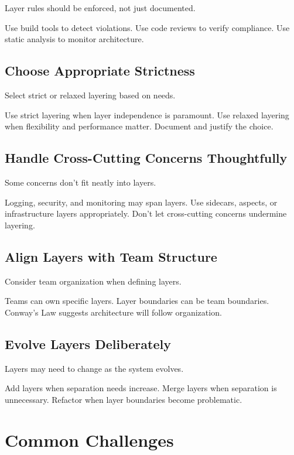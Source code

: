 \documentclass[11pt]{article}
\begin{document}
Layer rules should be enforced, not just documented.

Use build tools to detect violations. Use code reviews to verify compliance. Use static analysis to monitor architecture.

\subsection{Choose Appropriate Strictness}

Select strict or relaxed layering based on needs.

Use strict layering when layer independence is paramount. Use relaxed layering when flexibility and performance matter. Document and justify the choice.

\subsection{Handle Cross-Cutting Concerns Thoughtfully}

Some concerns don't fit neatly into layers.

Logging, security, and monitoring may span layers. Use sidecars, aspects, or infrastructure layers appropriately. Don't let cross-cutting concerns undermine layering.

\subsection{Align Layers with Team Structure}

Consider team organization when defining layers.

Teams can own specific layers. Layer boundaries can be team boundaries. Conway's Law suggests architecture will follow organization.

\subsection{Evolve Layers Deliberately}

Layers may need to change as the system evolves.

Add layers when separation needs increase. Merge layers when separation is unnecessary. Refactor when layer boundaries become problematic.

\section{Common Challenges}
\end{document}
